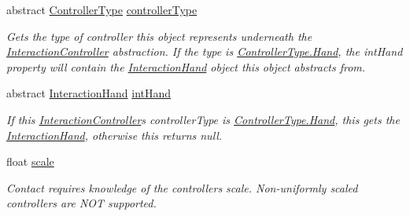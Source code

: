 \begin{DoxyCompactItemize}
abstract \mbox{\hyperlink{namespace_leap_1_1_unity_1_1_interaction_a9752eb3e2905e8ebd134fff20c155e6b}{Controller\+Type}} \mbox{\hyperlink{class_leap_1_1_unity_1_1_interaction_1_1_interaction_controller_a92f1e18d2bbdd8b1e3eea0d3c98c0b9f}{controller\+Type}}
\begin{DoxyCompactList}\small\item\em Gets the type of controller this object represents underneath the \mbox{\hyperlink{class_leap_1_1_unity_1_1_interaction_1_1_interaction_controller}{Interaction\+Controller}} abstraction. If the type is \mbox{\hyperlink{namespace_leap_1_1_unity_1_1_interaction_a9752eb3e2905e8ebd134fff20c155e6baa78b1ac16c0cd02168097fc9a9bd7604}{Controller\+Type.\+Hand}}, the int\+Hand property will contain the \mbox{\hyperlink{class_leap_1_1_unity_1_1_interaction_1_1_interaction_hand}{Interaction\+Hand}} object this object abstracts from. \end{DoxyCompactList}\item 
abstract \mbox{\hyperlink{class_leap_1_1_unity_1_1_interaction_1_1_interaction_hand}{Interaction\+Hand}} \mbox{\hyperlink{class_leap_1_1_unity_1_1_interaction_1_1_interaction_controller_aa1fbc2fcb4bbb72436b53d5e74b5cd4f}{int\+Hand}}
\begin{DoxyCompactList}\small\item\em If this \mbox{\hyperlink{class_leap_1_1_unity_1_1_interaction_1_1_interaction_controller}{Interaction\+Controller}}\textquotesingle{}s controller\+Type is \mbox{\hyperlink{namespace_leap_1_1_unity_1_1_interaction_a9752eb3e2905e8ebd134fff20c155e6baa78b1ac16c0cd02168097fc9a9bd7604}{Controller\+Type.\+Hand}}, this gets the \mbox{\hyperlink{class_leap_1_1_unity_1_1_interaction_1_1_interaction_hand}{Interaction\+Hand}}, otherwise this returns null. \end{DoxyCompactList}\item 
float \mbox{\hyperlink{class_leap_1_1_unity_1_1_interaction_1_1_interaction_controller_ab14c000b2374afa1b711f394ca45fead}{scale}}
\begin{DoxyCompactList}\small\item\em Contact requires knowledge of the controller\textquotesingle{}s scale. Non-\/uniformly scaled controllers are N\+OT supported. \end{DoxyCompactList}\item 

\end{DoxyCompactItemize}
